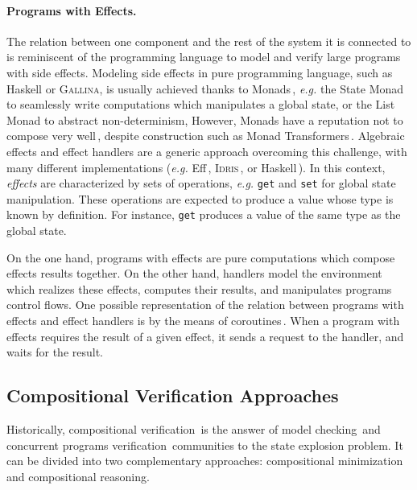\paragraph{Programs with Effects.}
%
The relation between one component and the rest of the system it is connected to
is reminiscent of the programming language to model and verify large programs
with side effects.
%
Modeling side effects in pure programming language, such as Haskell or {\scshape
  Gallina}, is usually achieved thanks to
Monads\,\cite{wadler1990comprehending,jones2005io}, \emph{e.g.} the State Monad
to seamlessly write computations which manipulates a global state, or the List
Monad to abstract non-determinism,
%
However, Monads have a reputation not to compose very
well\,\cite{hyland2006combining}, despite construction such as Monad
Transformers\,\cite{liang1995mtl}.
%
Algebraic effects and effect handlers are a generic approach overcoming this
challenge, with many different implementations (\emph{e.g.}
Eff\,\cite{bauer2015effects}, {\scshape Idris}\,\cite{brady2013idris}, or
Haskell\,\cite{kiselyov2013extensible}).
%
In this context, \emph{effects} are characterized by sets of operations,
\emph{e.g.} \texttt{get} and \texttt{set} for global state manipulation.
%
These operations are expected to produce a value whose type is known by
definition.
%
For instance, \texttt{get} produces a value of the same type as the global
state.

On the one hand, programs with effects are pure computations which compose
effects results together.
%
On the other hand, handlers model the environment which realizes these effects,
computes their results, and manipulates programs control flows.
%
One possible representation of the relation between programs with effects and
effect handlers is by the means of coroutines\,\cite{kiselyov2013extensible}.
%
When a program with effects requires the result of a given effect, it sends a
request to the handler, and waits for the result.

\subsection{Compositional Verification Approaches}
\label{subsec:sota:compverif}

Historically, compositional verification\,\cite{peng1998survey} is the answer of
model checking\,\cite{mcmillan1989compositional} and concurrent programs
verification\,\cite{jones1983tentative} communities to the state explosion
problem.
%
It can be divided into two complementary approaches: compositional minimization
and compositional reasoning.

